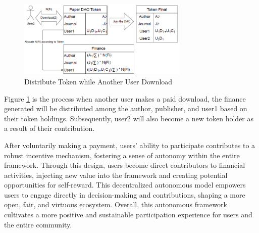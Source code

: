 \documentclass[lettersize,journal]{IEEEtran}
\begin{document}
\begin{figure}[h]
  \centering
  \includegraphics[width=3.2in]{assets/donwload2.png}
  \caption{Distribute Token while Another User Download}
  \label{fig:financetoken2}
\end{figure}

Figure \ref{fig:financetoken2} is the process when another user makes a paid download, the finance generated will be distributed among the author, publisher, and user1 based on their token holdings. Subsequently, user2 will also become a new token holder as a result of their contribution.

After voluntarily making a payment, users' ability to participate contributes to a robust incentive mechanism, fostering a sense of autonomy within the entire framework. Through this design, users become direct contributors to financial activities, injecting new value into the framework and creating potential opportunities for self-reward. This decentralized autonomous model empowers users to engage directly in decision-making and contributions, shaping a more open, fair, and virtuous ecosystem. Overall, this autonomous framework cultivates a more positive and sustainable participation experience for users and the entire community.
\end{document}
